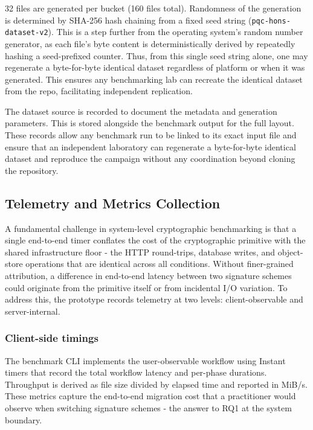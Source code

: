 \documentclass[12pt,a4paper]{article}
\begin{document}
32 files are generated per bucket (160 files total). Randomness of the generation is determined by SHA-256 hash chaining from a fixed seed string (\texttt{pqc-hons-dataset-v2}). This is a step further from the operating system's random number generator, as each file's byte content is deterministically derived by repeatedly hashing a seed-prefixed counter. Thus, from this single seed string alone, one may regenerate a byte-for-byte identical dataset regardless of platform or when it was generated. This ensures any benchmarking lab can recreate the identical dataset from the repo, facilitating independent replication.

The dataset source is recorded to document the metadata and generation parameters. This is stored alongside the benchmark output for the full layout. These records allow any benchmark run to be linked to its exact input file and ensure that an independent laboratory can regenerate a byte-for-byte identical dataset and reproduce the campaign without any coordination beyond cloning the repository.

\subsection{Telemetry and Metrics Collection}
\label{sec:telemetry}

A fundamental challenge in system-level cryptographic benchmarking is that a single end-to-end timer conflates the cost of the cryptographic primitive with the shared infrastructure floor - the HTTP round-trips, database writes, and object-store operations that are identical across all conditions. Without finer-grained attribution, a difference in end-to-end latency between two signature schemes could originate from the primitive itself or from incidental I/O variation. To address this, the prototype records telemetry at two levels: client-observable and server-internal.

\subsubsection{Client-side timings} The benchmark CLI implements the user-observable workflow using Instant timers that record the total workflow latency and per-phase durations. Throughput is derived as file size divided by elapsed time and reported in MiB/s. These metrics capture the end-to-end migration cost that a practitioner would observe when switching signature schemes - the answer to RQ1 at the system boundary.
\end{document}
